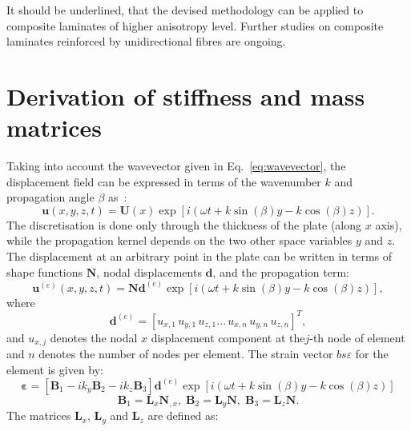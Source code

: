\documentclass[preprint,12pt]{elsarticle}
\newcommand{\matr}[1]{\mathbf{#1}} %
\newcommand{\vect}[1]{\mathbf{#1}} %
\newcommand{\bs}[1]{\boldsymbol{#1}}
\begin{document}
	It should be underlined, that the devised methodology can be applied to composite laminates of higher anisotropy level. Further studies on composite laminates reinforced by unidirectional fibres are ongoing.
	 
	\appendix
	 \section{Derivation of stiffness and mass matrices}
	 Taking into account the wavevector given in Eq.~\ref{eq:wavevector}, the 
	 displacement field can be expressed in terms of the wavenumber \(k\) and 
	 propagation angle \(\beta\) as~\cite{Taupin2011}:
	  \begin{equation}
	 \vect{u}(x,y,z,t) = \matr{U}(x) \exp \left[ i (\omega t + k \sin (\beta) y - k \cos (\beta) z)\right].
	 \end{equation}
	 The discretisation is done only through the thickness of the plate (along \(x\) axis), 
	 while the propagation kernel depends on the two other space variables \(y\) and \(z\). 
	 The displacement at an arbitrary point in the plate can be written in terms of shape 
	 functions \( \matr{N}\), nodal displacements \( \vect{d}\), and the propagation term:
	 \begin{equation}
	 \vect{u}^{(e)}(x,y,z,t) = \matr{N} \vect{d}^{(e)} \exp \left[ i (\omega t + k \sin (\beta) y - k \cos (\beta) z)\right],
	 \end{equation}
	 where
	 \begin{equation}
	 \vect{d}^{(e)} =  \left[ u_{x,1} \, u_{y,1} \, u_{z,1} \ldots  \, u_{x,n} \, u_{y,n} \, u_{z,n} \right]^T,
	 \end{equation}
	 and \(u_{x,j}\) denotes the nodal \(x\) displacement component at the\(j\)-th node of 
	 element and \(n\) denotes the number of nodes per element.
	 The strain vector \(bs{\varepsilon}\) for the element is given by:
	  \begin{equation}
	 \bs{\varepsilon}= \left[ \matr{B}_1 -i k_y \matr{B}_2 -i k_z \matr{B}_3 \right] \vect{d}^{(e)} \exp \left[ i (\omega t + k \sin (\beta) y - k \cos (\beta) z)\right]
	 \end{equation}
	  \begin{equation}
	 \matr{B}_1= \matr{L}_x \matr{N}_{,x},\; \matr{B}_2= \matr{L}_y \matr{N},\; \matr{B}_3= \matr{L}_z \matr{N}.
	 \end{equation}
	 The matrices \( \matr{L}_x \),  \( \matr{L}_y \) and  \( \matr{L}_z \) are defined as:
\end{document}
